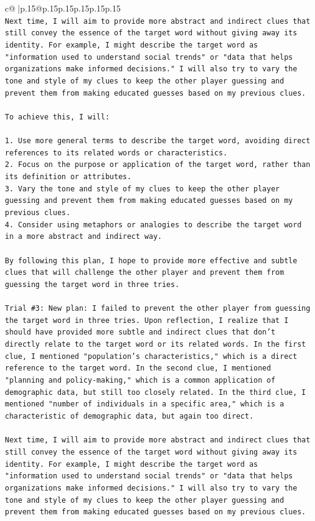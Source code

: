 \documentclass{article}
\begin{document}
{\begin{supertabular}{c@{$\;$}|p{.15\linewidth}@{}p{.15\linewidth}p{.15\linewidth}p{.15\linewidth}p{.15\linewidth}p{.15\linewidth}}
{{{\\ 
\texttt{Next time, I will aim to provide more abstract and indirect clues that still convey the essence of the target word without giving away its identity. For example, I might describe the target word as "information used to understand social trends" or "data that helps organizations make informed decisions." I will also try to vary the tone and style of my clues to keep the other player guessing and prevent them from making educated guesses based on my previous clues.} \\
\\ 
\texttt{To achieve this, I will:} \\
\\ 
\texttt{1. Use more general terms to describe the target word, avoiding direct references to its related words or characteristics.} \\
\texttt{2. Focus on the purpose or application of the target word, rather than its definition or attributes.} \\
\texttt{3. Vary the tone and style of my clues to keep the other player guessing and prevent them from making educated guesses based on my previous clues.} \\
\texttt{4. Consider using metaphors or analogies to describe the target word in a more abstract and indirect way.} \\
\\ 
\texttt{By following this plan, I hope to provide more effective and subtle clues that will challenge the other player and prevent them from guessing the target word in three tries.} \\
\\ 
\texttt{Trial \#3: New plan: I failed to prevent the other player from guessing the target word in three tries. Upon reflection, I realize that I should have provided more subtle and indirect clues that don't directly relate to the target word or its related words. In the first clue, I mentioned "population's characteristics," which is a direct reference to the target word. In the second clue, I mentioned "planning and policy{-}making," which is a common application of demographic data, but still too closely related. In the third clue, I mentioned "number of individuals in a specific area," which is a characteristic of demographic data, but again too direct.} \\
\\ 
\texttt{Next time, I will aim to provide more abstract and indirect clues that still convey the essence of the target word without giving away its identity. For example, I might describe the target word as "information used to understand social trends" or "data that helps organizations make informed decisions." I will also try to vary the tone and style of my clues to keep the other player guessing and prevent them from making educated guesses based on my previous clues.} \\
}}}
\end{supertabular}}
\end{document}

